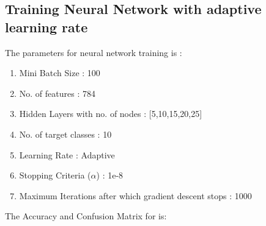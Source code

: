 \documentclass[11pt]{article}
\begin{document}
\subsection{Training Neural Network with adaptive learning rate}
The parameters for neural network training is :
\begin{enumerate}
\item Mini Batch Size : 100
\item No. of features : 784
\item Hidden Layers with no. of nodes : [5,10,15,20,25]
\item No. of target classes : 10
\item Learning Rate : Adaptive
\item Stopping Criteria ($\alpha$) : 1e-8
\item Maximum Iterations after which gradient descent stops : 1000
\end{enumerate}
The Accuracy and Confusion Matrix for is:
\vspace{3mm}
\hline
\end{document}
